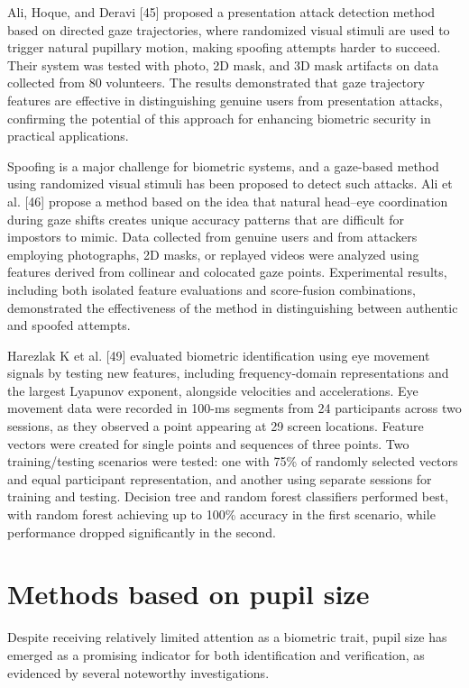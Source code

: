 \documentclass[12pt]{report}
\begin{document}
Ali, Hoque, and Deravi [45] proposed a presentation attack detection method based on directed gaze trajectories, where randomized visual stimuli are used to trigger natural pupillary motion, making spoofing attempts harder to succeed. 
Their system was tested with photo, 2D mask, and 3D mask artifacts on data collected from 80 volunteers.
The results demonstrated that gaze trajectory features are effective in distinguishing genuine users from presentation attacks, confirming the potential of this approach for enhancing biometric security in practical applications.

Spoofing is a major challenge for biometric systems, and a gaze-based method using randomized visual stimuli has been proposed to detect such attacks.
Ali et al. [46] propose a method based on the idea that natural head–eye coordination during gaze shifts creates unique accuracy patterns that are difficult for impostors to mimic.
Data collected from genuine users and from attackers employing photographs, 2D masks, or replayed videos were analyzed using features derived from collinear and colocated gaze points. 
Experimental results, including both isolated feature evaluations and score-fusion combinations, demonstrated the effectiveness of the method in distinguishing between authentic and spoofed attempts.

Harezlak K et al. [49] evaluated biometric identification using eye movement signals by testing new features, including frequency-domain representations and the largest Lyapunov exponent, alongside velocities and accelerations.
Eye movement data were recorded in 100-ms segments from 24 participants across two sessions, as they observed a point appearing at 29 screen locations. 
Feature vectors were created for single points and sequences of three points. 
Two training/testing scenarios were tested: one with 75\% of randomly selected vectors and equal participant representation, and another using separate sessions for training and testing.
Decision tree and random forest classifiers performed best, with random forest achieving up to 100\% accuracy in the first scenario, while performance dropped significantly in the second.

\section{Methods based on pupil size}

Despite receiving relatively limited attention as a biometric trait, pupil size has emerged as a promising indicator for both identification and verification, as evidenced by several noteworthy investigations.
\end{document}
